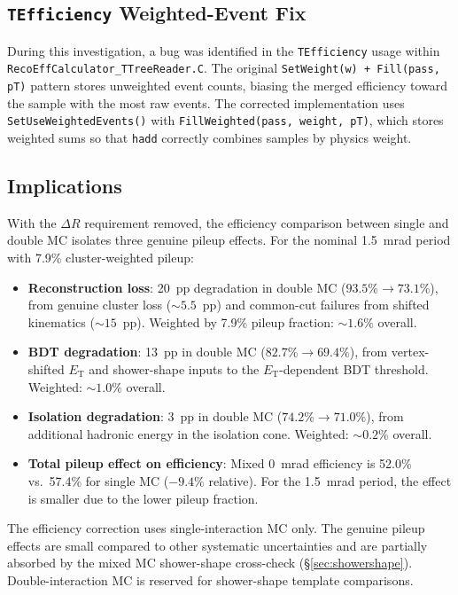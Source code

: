 \documentclass[11pt,a4paper]{article}
\newcommand{\ET}{\ensuremath{E_{\text{T}}}\xspace}
\newcommand{\DR}{\ensuremath{\Delta R}\xspace}
\begin{document}
\subsection{\texttt{TEfficiency} Weighted-Event Fix}
\label{subsec:tefficiency_fix}

During this investigation, a bug was identified in the \texttt{TEfficiency}
usage within \texttt{RecoEffCalculator\_TTreeReader.C}.
The original \texttt{SetWeight(w) + Fill(pass, pT)} pattern stores unweighted
event counts, biasing the merged efficiency toward the sample with the most raw
events.
The corrected implementation uses \texttt{SetUseWeightedEvents()} with
\texttt{FillWeighted(pass, weight, pT)}, which stores weighted sums so that
\texttt{hadd} correctly combines samples by physics weight.

\subsection{Implications}
\label{subsec:di_implications}

With the \DR requirement removed, the efficiency comparison between single and
double MC isolates three genuine pileup effects.
For the nominal 1.5~mrad period with 7.9\% cluster-weighted pileup:

\begin{itemize}
    \item \textbf{Reconstruction loss}: 20~pp degradation in double MC
      ($93.5\% \to 73.1\%$), from genuine cluster loss (${\sim}5.5$~pp) and
      common-cut failures from shifted kinematics (${\sim}15$~pp).
      Weighted by 7.9\% pileup fraction: ${\sim}1.6\%$ overall.
    \item \textbf{BDT degradation}: 13~pp in double MC ($82.7\% \to 69.4\%$),
      from vertex-shifted \ET and shower-shape inputs to the \ET-dependent BDT
      threshold. Weighted: ${\sim}1.0\%$ overall.
    \item \textbf{Isolation degradation}: 3~pp in double MC ($74.2\% \to 71.0\%$),
      from additional hadronic energy in the isolation cone. Weighted:
      ${\sim}0.2\%$ overall.
    \item \textbf{Total pileup effect on efficiency}: Mixed 0~mrad efficiency is
      52.0\% vs.\ 57.4\% for single MC ($-9.4\%$ relative). For the 1.5~mrad
      period, the effect is smaller due to the lower pileup fraction.
\end{itemize}

The efficiency correction uses single-interaction MC only.
The genuine pileup effects are small compared to other systematic uncertainties
and are partially absorbed by the mixed MC shower-shape cross-check
(\S\ref{sec:showershape}).
Double-interaction MC is reserved for shower-shape template comparisons.
\end{document}
